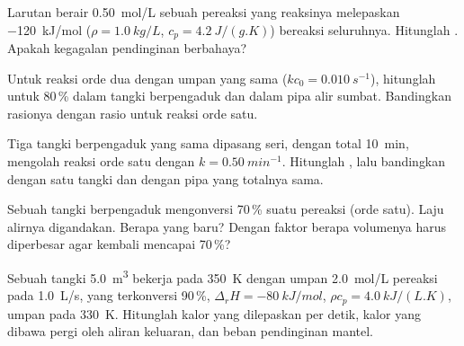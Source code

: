 \begin{exercise}[$\star$]\label{exo:b2:continuous-reactors:4}
Larutan berair \qty{0.50}{mol/L} sebuah pereaksi yang reaksinya
melepaskan \qty{-120}{kJ/mol} ($\rho = \qty{1.0}{kg/L}$, $c_p =
\qty{4.2}{J/(g.K)}$) bereaksi seluruhnya. Hitunglah . Apakah kegagalan pendinginan berbahaya?
\end{exercise}

\begin{exercise}[$\star\star$]\label{exo:b2:continuous-reactors:5}
Untuk reaksi orde dua dengan umpan yang sama ($kc_0 = \qty{0.010}{s^{-1}}$),
hitunglah  untuk  80\,\% dalam tangki berpengaduk dan
dalam pipa alir sumbat. Bandingkan rasionya dengan rasio untuk reaksi orde
satu.
\end{exercise}

\begin{exercise}[$\star\star$]\label{exo:b2:continuous-reactors:6}
Tiga tangki berpengaduk yang sama dipasang seri, dengan 
total \qty{10}{min}, mengolah reaksi orde satu dengan
$k = \qty{0.50}{min^{-1}}$. Hitunglah , lalu bandingkan dengan
satu tangki dan dengan pipa yang  totalnya sama.
\end{exercise}

\begin{exercise}[$\star\star$]\label{exo:b2:continuous-reactors:7}
Sebuah tangki berpengaduk mengonversi 70\,\% suatu pereaksi (orde satu).
Laju alirnya digandakan. Berapa  yang baru? Dengan faktor berapa
volumenya harus diperbesar agar kembali mencapai 70\,\%?
\end{exercise}

\begin{exercise}[$\star\star$]\label{exo:b2:continuous-reactors:8}
Sebuah tangki \qty{5.0}{m^3} bekerja pada \qty{350}{K} dengan umpan
\qty{2.0}{mol/L} pereaksi pada \qty{1.0}{L/s}, yang terkonversi 90\,\%,
$\Delta_r H
= \qty{-80}{kJ/mol}$, $\rho c_p = \qty{4.0}{kJ/(L.K)}$, umpan
pada \qty{330}{K}. Hitunglah kalor yang dilepaskan per detik, kalor yang
dibawa pergi oleh aliran keluaran, dan beban pendinginan mantel.
\end{exercise}

